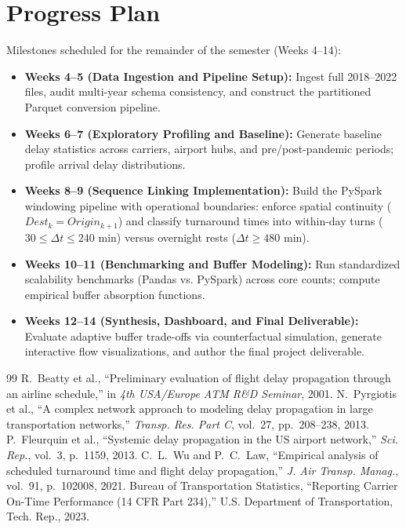 \documentclass{article}
\begin{document}
\section{Progress Plan}
Milestones scheduled for the remainder of the semester (Weeks 4--14):
\begin{itemize}
    \item \textbf{Weeks 4--5 (Data Ingestion and Pipeline Setup):} Ingest full 2018--2022 files, audit multi-year schema consistency, and construct the partitioned Parquet conversion pipeline.
    \item \textbf{Weeks 6--7 (Exploratory Profiling and Baseline):} Generate baseline delay statistics across carriers, airport hubs, and pre/post-pandemic periods; profile arrival delay distributions.
    \item \textbf{Weeks 8--9 (Sequence Linking Implementation):} Build the PySpark windowing pipeline with operational boundaries: enforce spatial continuity ($Dest_k = Origin_{k+1}$) and classify turnaround times into within-day turns ($30 \le \Delta t \le 240$ min) versus overnight rests ($\Delta t \ge 480$ min).
    \item \textbf{Weeks 10--11 (Benchmarking and Buffer Modeling):} Run standardized scalability benchmarks (Pandas vs. PySpark) across core counts; compute empirical buffer absorption functions.
    \item \textbf{Weeks 12--14 (Synthesis, Dashboard, and Final Deliverable):} Evaluate adaptive buffer trade-offs via counterfactual simulation, generate interactive flow visualizations, and author the final project deliverable.
\end{itemize}

\begin{thebibliography}{99}\small
{}
R.~Beatty et al., ``Preliminary evaluation of flight delay propagation through an airline schedule,'' in \textit{4th USA/Europe ATM R\&D Seminar}, 2001.
N.~Pyrgiotis et al., ``A complex network approach to modeling delay propagation in large transportation networks,'' \textit{Transp. Res. Part C}, vol.~27, pp.~208--238, 2013.
P.~Fleurquin et al., ``Systemic delay propagation in the US airport network,'' \textit{Sci. Rep.}, vol.~3, p.~1159, 2013.
C.~L.~Wu and P.~C.~Law, ``Empirical analysis of scheduled turnaround time and flight delay propagation,'' \textit{J. Air Transp. Manag.}, vol.~91, p.~102008, 2021.
Bureau of Transportation Statistics, ``Reporting Carrier On-Time Performance (14 CFR Part 234),'' U.S. Department of Transportation, Tech. Rep., 2023.
\end{thebibliography}
\end{document}
